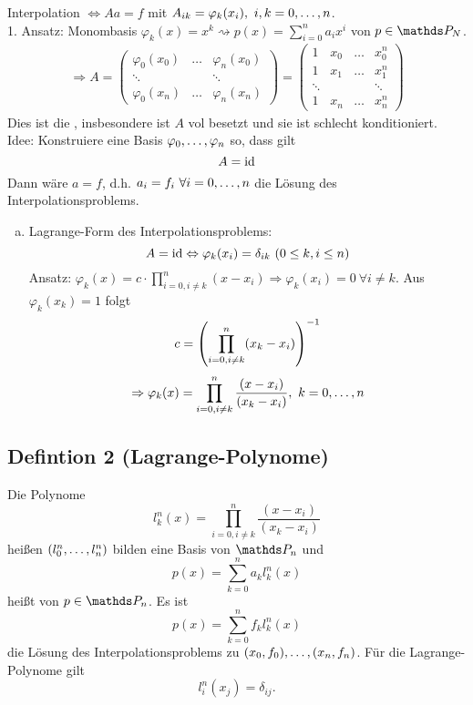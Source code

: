 Interpolation $\Leftrightarrow Aa=f$ mit $A_{ik}=\varphi_k(x_i),~i,k=0, \dots ,n$.\\
1. Ansatz: Monombasis $\varphi_k(x)=x^k \rightsquigarrow p(x)=\sum_{i=0}^{n}a_ix^i$  von $p\in \Pw_N$.
\begin{equation*}
\begin{aligned}
	\Rightarrow A= \begin{pmatrix}
	\varphi_0(x_0) & \dots & \varphi_n(x_0)\\
	\ddots & & \ddots\\
	\varphi_0(x_n) & \dots & \varphi_n(x_n)
	\end{pmatrix} = \begin{pmatrix}
	1 & x_0 & \dots & x_0^n\\
	1 & x_1 & \dots & x_1^n\\
	\ddots & & & \ddots\\
	1 & x_n & \dots & x_n^n
	\end{pmatrix}
\end{aligned}
\end{equation*}
Dies ist die , insbesondere ist $A$ vol besetzt und sie ist schlecht konditioniert.\\
Idee: Konstruiere eine Basis $\varphi_0, \dots ,\varphi_n$ so, dass gilt
\[
A=\operatorname{id}
\]
Dann wäre $a=f$, d.h. $a_i=f_i~\forall i=0, \dots ,n$ die Lösung des Interpolationsproblems.
\begin{enumerate}[(a)]
	\item Lagrange-Form des Interpolationsproblems:
	\[
	A=\operatorname{id} \Leftrightarrow \varphi_k(x_i)=\delta_{ik}~(0\le k,i\le n)
	\]
	Ansatz: $\varphi_k(x)=c\cdot \prod_{i=0,i\neq k}^{n}(x-x_i) \Rightarrow \varphi_k(x_i)=0~\forall i\neq k$.
	Aus $\varphi_k(x_k)=1$ folgt
	\[
	c=\left( \prod_{i=0, i\neq k}^{n}(x_k-x_i)\right)^{-1}
	\]
	\[
	\Rightarrow \varphi_k(x)= \prod_{i=0,i\neq k}^{n}\frac{(x-x_i)}{(x_k-x_i)},~k=0, \dots ,n
	\]
\end{enumerate}
\subsection{Defintion 2 (Lagrange-Polynome)}
\label{sub:def_2}
Die Polynome 
\[
l_k^n(x)= \prod_{i=0,i\neq k}^{n}\frac{(x-x_i)}{(x_k-x_i)}
\]
heißen  $(l_0^n, \dots ,l_n^n)$ bilden eine Basis von $\Pw_n$ und 
\[
p(x)= \sum_{k=0}^n a_k l_k^n(x)
\]
heißt  von $p\in \Pw_n$.
Es ist 
\[
p(x)= \sum_{k=0}^{n}f_kl_k^n(x)
\]
die Lösung des Interpolationsproblems zu $(x_0,f_0), \dots ,(x_n,f_n)$.
Für die Lagrange-Polynome gilt 
\[
l_i^n(x_j)=\delta_{ij}.
\]

